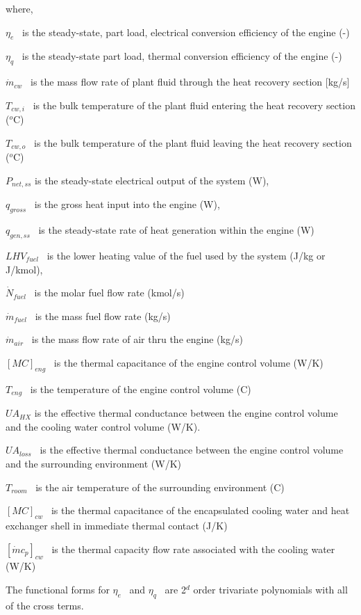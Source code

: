 where,

\({\eta_e}\) ~is the steady-state, part load, electrical conversion efficiency of the engine (-)

\({\eta_q}\) ~is the steady-state part load, thermal conversion efficiency of the engine (-)

\({\dot m_{cw}}\) ~is the mass flow rate of plant fluid through the heat recovery section {[}kg/s{]}

\({T_{cw,i}}\) ~is the bulk temperature of the plant fluid entering the heat recovery section (\(^{o}\)C)

\({T_{cw,o}}\) ~is the bulk temperature of the plant fluid leaving the heat recovery section (\(^{o}\)C)

\({P_{net,ss}}\) is the steady-state electrical output of the system (W),

\({q_{gross}}\) ~is the gross heat input into the engine (W),

\({q_{gen,ss}}\) ~is the steady-state rate of heat generation within the engine (W)

\(LH{V_{fuel}}\) ~is the lower heating value of the fuel used by the system (J/kg or J/kmol),

\({\dot N_{fuel}}\) ~is the molar fuel flow rate (kmol/s)

\({\dot m_{fuel}}\) ~is the mass fuel flow rate (kg/s)

\({\dot m_{air}}\) ~is the mass flow rate of air thru the engine (kg/s)

\({[MC]_{eng}}\) ~is the thermal capacitance of the engine control volume (W/K)

\({T_{eng}}\) ~is the temperature of the engine control volume (C)

\(U{A_{HX}}\) is the effective thermal conductance between the engine control volume and the cooling water control volume (W/K).

\(U{A_{loss}}\) ~is the effective thermal conductance between the engine control volume and the surrounding environment (W/K)

\({T_{room}}\) ~is the air temperature of the surrounding environment (C)

\({[MC]_{cw}}\) ~is the thermal capacitance of the encapsulated cooling water and heat exchanger shell in immediate thermal contact (J/K)

\({[\dot m{c_p}]_{cw}}\) ~is the thermal capacity flow rate associated with the cooling water (W/K)

The functional forms for \({\eta_e}\) ~and \({\eta_q}\) ~are 2\(^{d}\) order trivariate polynomials with all of the cross terms.

